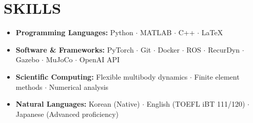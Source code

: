 \documentclass[a4paper,10pt]{extarticle}
\begin{document}

\section*{SKILLS}
\begin{itemize}
	\item \textbf{Programming Languages: }Python $\cdot$ MATLAB $\cdot$ C++ $\cdot$ \LaTeX
	\item \textbf{Software \& Frameworks: }PyTorch $\cdot$ Git $\cdot$ Docker $\cdot$ ROS $\cdot$ RecurDyn $\cdot$ Gazebo $\cdot$ MuJoCo $\cdot$ OpenAI API
	\item \textbf{Scientific Computing: }Flexible multibody dynamics $\cdot$ Finite element methods $\cdot$ Numerical analysis
	\item \textbf{Natural Languages: }Korean (Native) $\cdot$ English (TOEFL iBT 111/120) $\cdot$ Japanese (Advanced proficiency)
\end{itemize}
\end{document}

